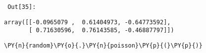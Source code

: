         {\par%
        \vspace{-1\smallerfontscale}%
        \noindent%
        \begin{minipage}{\cellleftmargin}%
    \hfill%
    {\smaller%
    \tt%
    \color{nbframe-out-prompt}%
    Out[35]:}%
    \hspace{\inputpadding}%
    \hspace{0em}%
    \hspace{3pt}%
    \end{minipage}%
        }%
    \begin{addmargin}[\cellleftmargin]{0em}%
    {\smaller%
    \vspace{-1\smallerfontscale}%
    
    
    
    \begin{verbatim}
array([[-0.0965079 ,  0.61404973, -0.64773592],
       [ 0.71630596,  0.76143585, -0.46887797]])
    \end{verbatim}

    
}%
    \end{addmargin}%

{\par%
\vspace{-1\baselineskip}%
}%
\begin{notebookcell}[36]%
\begin{addmargin}[\cellleftmargin]{0em}%
{\smaller%
\par%
%
\vspace{-1\smallerfontscale}%
\begin{Verbatim}[commandchars=\\\{\}]
\PY{n}{random}\PY{o}{.}\PY{n}{poisson}\PY{p}{(}\PY{p}{)}
\end{Verbatim}
%
\par%
\vspace{-1\smallerfontscale}}%
\end{addmargin}
\end{notebookcell}

\par\vspace{1\smallerfontscale}%
    
